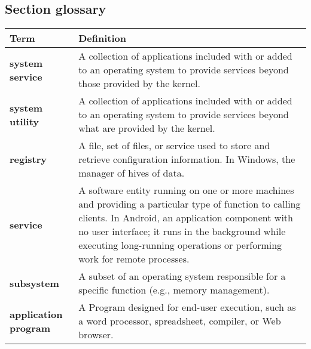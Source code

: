 \subsection*{Section glossary}
\begin{tabular}{>{\raggedright}p{} >{\raggedright\arraybackslash}p{}}
\toprule
\textbf{Term} & \textbf{Definition} \\
\midrule
\textbf{system service} & A collection of applications included with or added to an operating system to provide services beyond those provided by the kernel. \\
\textbf{system utility} & A collection of applications included with or added to an operating system to provide services beyond what are provided by the kernel. \\
\textbf{registry} & A file, set of files, or service used to store and retrieve configuration information. In Windows, the manager of hives of data. \\
\textbf{service} & A software entity running on one or more machines and providing a particular type of function to calling clients. In Android, an application component with no user interface; it runs in the background while executing long-running operations or performing work for remote processes. \\
\textbf{subsystem} & A subset of an operating system responsible for a specific function (e.g., memory management). \\
\textbf{application program} & A Program designed for end-user execution, such as a word processor, spreadsheet, compiler, or Web browser. \\
\bottomrule
\end{tabular}
\vspace{\baselineskip}
